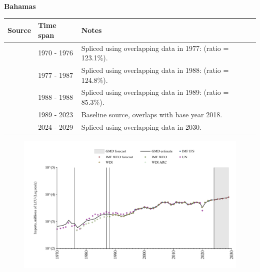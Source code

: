 \documentclass[12pt,a4paper,landscape]{article}
\begin{document}
\begin{adjustbox}{max totalsize={\paperwidth}{\paperheight},center}
\begin{minipage}[t][\textheight][t]{\textwidth}
\vspace*{0.5cm}
{}
\begin{center}
{\Large\bfseries Bahamas}
\end{center}
\vspace{0.5cm}
\begin{table}[H]
\centering
\small
\begin{tabular}{|l|l|l|}
\hline
\textbf{Source} & \textbf{Time span} & \textbf{Notes} \\
\hline
\rowcolor{white}\cite{UN}& 1970 - 1976 &Spliced using overlapping data in 1977: (ratio = 123.1\%).\\
\rowcolor{lightgray}\cite{WDI}& 1977 - 1987 &Spliced using overlapping data in 1988: (ratio = 124.8\%).\\
\rowcolor{white}\cite{UN}& 1988 - 1988 &Spliced using overlapping data in 1989: (ratio = 85.3\%).\\
\rowcolor{lightgray}\cite{WDI}& 1989 - 2023 &Baseline source, overlaps with base year 2018.\\
\rowcolor{white}\cite{IMF_WEO_forecast}& 2024 - 2029 &Spliced using overlapping data in 2030.\\
\hline
\end{tabular}
\end{table}
\begin{figure}[H]
\centering
\includegraphics[width=\textwidth,height=0.6\textheight,keepaspectratio]{graphs/BHS_imports.pdf}
\end{figure}
\end{minipage}
\end{adjustbox}
\end{document}
